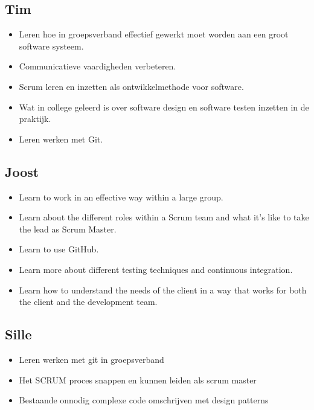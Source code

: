 \documentclass{article}
\begin{document}
\subsection*{Tim}
\begin{itemize}
	\item Leren hoe in groepsverband effectief gewerkt moet worden aan een groot software systeem.
	\item Communicatieve vaardigheden verbeteren.
	\item Scrum leren en inzetten als ontwikkelmethode voor software.
	\item Wat in college geleerd is over software design en software testen inzetten in de praktijk.
	\item Leren werken met Git.
\end{itemize}
\subsection*{Joost}
\begin{itemize}
	\item Learn to work in an effective way within a large group.
	\item Learn about the different roles within a Scrum team and what it's like to take the lead as Scrum Master.
	\item Learn to use GitHub.
	\item Learn more about different testing techniques and continuous integration.
	\item Learn how to understand the needs of the client in a way that works for both the client and the development team.
\end{itemize}
\subsection*{Sille}
\begin{itemize}
	\item Leren werken met git in groepsverband
	\item Het SCRUM proces snappen en kunnen leiden als scrum master
	\item Bestaande onnodig complexe code omschrijven met design patterns
\end{itemize}
\end{document}
